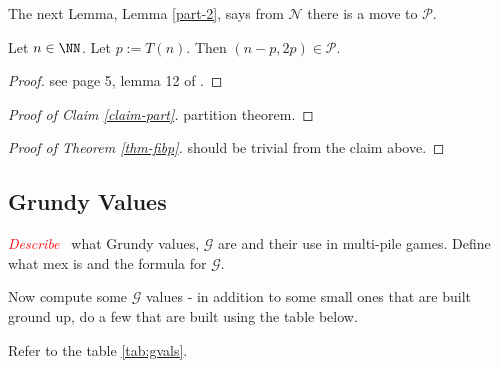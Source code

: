 \documentclass[11pt,twoside]{scrartcl}
\newcommand{\mcG}{\mathcal{G}}
\newcommand{\msN}{\mathscr{N}}
\newcommand{\msP}{\mathscr{P}}
\newcommand{\TODO}[1]{\emph{\textcolor{red}{#1\ }}}
\begin{document}
\vspace{6pt}
The next Lemma, Lemma \ref{part-2}, says from $\msN$ there is a move to $\msP$.
\begin{lemma}\label{part-2}
    Let $n \in \NN$. Let $p := T(n)$. Then $(n - p, 2p) \in \msP$.
\end{lemma}
\begin{proof}
    \TBD see page 5, lemma 12 of \cite{cody}.
\end{proof}

\vspace{6pt}
\begin{proof}[Proof of Claim \ref{claim-part}]
    \TBD partition theorem.
\end{proof}

\vspace{6pt}
\begin{proof}[Proof of Theorem \ref{thm-fibp}]
    \TBD should be trivial from the claim above.
\end{proof}

\subsection{Grundy Values}
\TODO{Describe} what Grundy values, $\mcG$ are and their use in multi-pile games. Define what mex is and the formula for $\mcG$.

Now compute some $\mcG$ values - in addition to some small ones that are built ground up, do a few that are built using the table below.

Refer to the table \ref{tab:gvals}.
\end{document}
